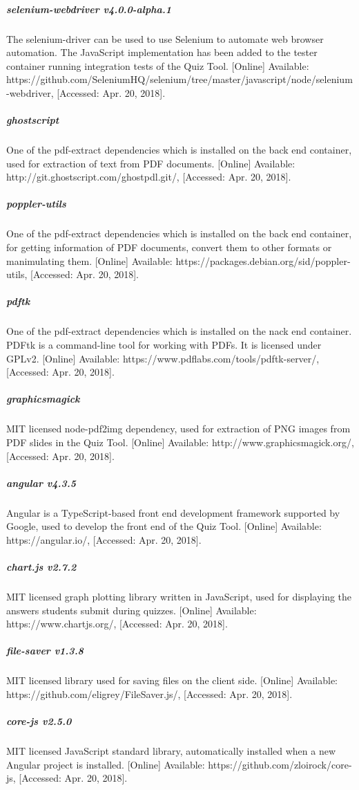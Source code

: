 \subparagraph{selenium-webdriver v4.0.0-alpha.1}
The selenium-driver can be used to use Selenium to automate web browser automation. The
JavaScript implementation has been added to the tester container running integration tests of
the Quiz Tool. [Online] Available: https://github.com/SeleniumHQ/selenium/tree/master/javascript/node/selenium-webdriver, [Accessed: Apr. 20, 2018].

\subparagraph{ghostscript}
One of the pdf-extract dependencies which is installed on the back end container, used for
extraction of text from PDF documents. [Online] Available:
http://git.ghostscript.com/ghostpdl.git/, [Accessed: Apr. 20, 2018].

\subparagraph{poppler-utils}
One of the pdf-extract dependencies which is installed on the back end container, for
getting information of PDF documents, convert them to other formats or manimulating them.
[Online] Available: https://packages.debian.org/sid/poppler-utils, [Accessed: Apr. 20, 2018].

\subparagraph{pdftk}
One of the pdf-extract dependencies which is installed on the nack end container. PDFtk is
a command-line tool for working with PDFs. It is licensed under GPLv2.
[Online] Available: https://www.pdflabs.com/tools/pdftk-server/, [Accessed: Apr. 20, 2018].

\subparagraph{graphicsmagick}
MIT licensed node-pdf2img dependency, used for extraction of PNG images from PDF slides in the Quiz Tool.
[Online] Available: http://www.graphicsmagick.org/, [Accessed: Apr. 20, 2018].

\subparagraph{angular v4.3.5}
Angular is a TypeScript-based front end development framework supported by Google, used to
develop the front end of the Quiz Tool.
[Online] Available: https://angular.io/, [Accessed: Apr. 20, 2018].

\subparagraph{chart.js v2.7.2}
MIT licensed graph plotting library written in JavaScript, used for displaying the answers
students submit during quizzes.
[Online] Available: https://www.chartjs.org/, [Accessed: Apr. 20, 2018].

\subparagraph{file-saver v1.3.8}
MIT licensed library used for saving files on the client side.
[Online] Available: https://github.com/eligrey/FileSaver.js/, [Accessed: Apr. 20, 2018].

\subparagraph{core-js v2.5.0}
MIT licensed JavaScript standard library, automatically installed when a new Angular project
is installed. [Online] Available: https://github.com/zloirock/core-js, [Accessed: Apr. 20, 2018].

